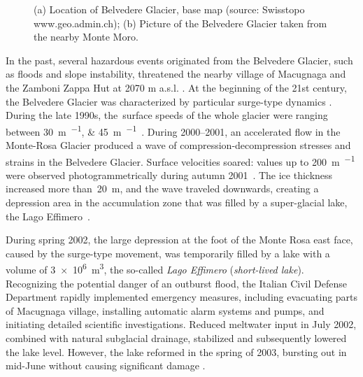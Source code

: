 \begin{figure}
    \centering
    \caption{(a) Location of Belvedere Glacier, base map (source: Swisstopo
        www.geo.admin.ch); (b) Picture of the Belvedere Glacier taken from the nearby Monte Moro.}
    \label{fig:1:studyarea}
\end{figure}

In the past, several hazardous events originated from the Belvedere Glacier, such as floods and slope instability, threatened the nearby village of Macugnaga and the Zamboni Zappa Hut at 2070 m a.s.l. \citep{Kaab2004}.
At the beginning of the 21st century, the Belvedere Glacier was characterized by particular surge-type dynamics  \citep{Haeberli2002}.
During the late 1990s, the~surface speeds of the whole glacier were ranging between \SIlist{30;45}{\meter\per\year}~\citep{Roethlisberger1985, Kaab2005}.
During 2000--2001, an accelerated flow in the Monte-Rosa Glacier produced a wave of compression-decompression stresses and strains in the Belvedere Glacier.
Surface velocities soared: values up to \SI{200}{\meter\per\year} were observed
photogrammetrically during autumn 2001~\citep{Kaab2004}.
The ice thickness increased more than~\SI{20}{\meter}, and the wave traveled downwards, creating a depression area in the accumulation zone that was filled by a super-glacial lake, the Lago Effimero~\citep{Haeberli2002, Mortara2009}.

During spring 2002, the large depression at the foot of the Monte Rosa east face, caused by the surge-type movement, was temporarily filled by a lake with a volume of \SI{3e6}{\cubic\meter}, the so-called \textit{Lago Effimero} (\textit{short-lived lake}).
Recognizing the potential danger of an outburst flood, the Italian Civil Defense Department rapidly implemented emergency measures, including evacuating parts of Macugnaga village, installing automatic alarm systems and pumps, and initiating detailed scientific investigations. 
Reduced meltwater input in July 2002, combined with natural subglacial drainage, stabilized and subsequently lowered the lake level.
However, the lake reformed in the spring of 2003, bursting out in mid-June without causing significant damage \citep{Kaab2004}.


